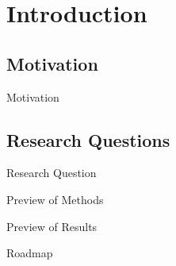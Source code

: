 \documentclass[10pt]{beamer}
\title[ ] %
{}
\author[ ] %
{Kangli Li \inst{1}}
\institute[]{\inst{1} University of Wisconsin-Madison}
\date[ ] %
{Seminar name}
\begin{document}
	
\begin{frame}
	\titlepage
\end{frame}


\section{Introduction}

\subsection{Motivation}

\begin{frame}{Motivation}
\linespread{1.5}
\end{frame}



\subsection{Research Questions}
\begin{frame}{Research Question}

\end{frame}



\begin{frame}{Preview of Methods}
\linespread{1.5}

\end{frame}


\begin{frame}{Preview of Results}
\linespread{1.5}

\end{frame}




\begin{frame}{Roadmap}
	\tableofcontents[hideallsubsections]
\end{frame}
\end{document}
